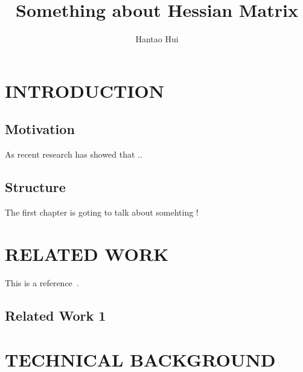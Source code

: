\documentclass[
	11pt, 
	a4paper, 
	oneside,  
	final, 
]{report}
\title{Something about Hessian Matrix}
\author{Hantao Hui}
\begin{document}
\maketitle
\newpage
\tableofcontents

\chapter{INTRODUCTION}
\section{Motivation}
As recent research has showed that ..
\section{Structure}
The first chapter is goting to talk about somehting !
\chapter{RELATED WORK}

This is a reference~\cite{Foley:1990}.

\section{Related Work 1}






\chapter{TECHNICAL BACKGROUND}
\end{document}
